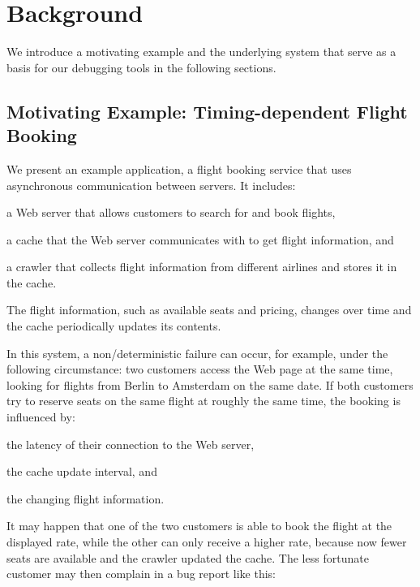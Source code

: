 \documentclass[preprint,3p]{elsarticle}
\begin{document}

\section{Background}
\label{sec:background}

We introduce a motivating example and the underlying system that serve as a basis for our debugging tools in the following sections.

\subsection{Motivating Example: Timing-dependent Flight Booking}

We present an example application, a flight booking service that uses asynchronous communication between servers. 
It includes:
\begin{inparaenum}
\item a Web server that allows customers to search for and book  flights,
\item a cache that the Web server communicates with to get flight information, and
\item a crawler that collects flight information from different  airlines and stores it in the cache.
\end{inparaenum}
The flight information, such as available seats and pricing, changes over time and the cache periodically updates its contents.

In this system, a non\-/deterministic failure can occur, for example, under the following circumstance: 
	two customers access the Web page at the same time, looking for flights from Berlin to Amsterdam on the same date. 
If both customers try to reserve seats on the same flight at roughly the same time, the booking is influenced by:
\begin{inparaenum}
\item the latency of their connection to the Web server,
\item the cache update interval, and
\item the changing flight information.
\end{inparaenum}
It may happen that one of the two customers is able to book the flight at the displayed rate, while the other can only receive a higher rate,
because now fewer seats are available and the crawler updated the cache. 
The less fortunate customer may then complain in a bug report like this:
\end{document}
